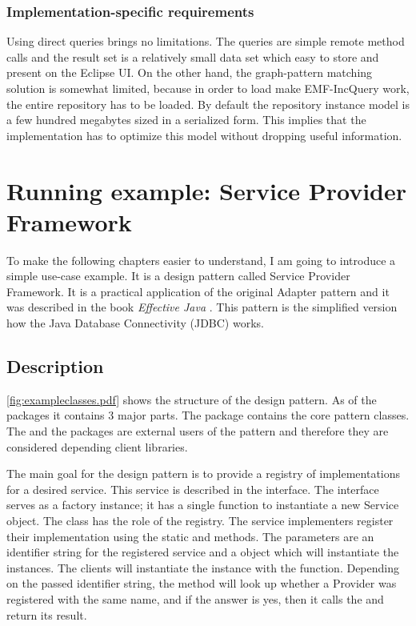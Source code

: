 \subsubsection{Implementation-specific requirements}
Using direct queries brings no limitations. The queries are simple remote method
calls and the result set is a relatively small data set which easy to store and
present on the Eclipse UI. On the other hand, the graph-pattern matching
solution is somewhat limited, because in order to load make EMF-IncQuery work,
the entire repository has to be loaded. By default the repository instance model
is a few hundred megabytes sized in a serialized form. This implies that the
implementation has to optimize this model without dropping useful information.

\section{Running example: Service Provider Framework}\label{sect:spf}

To make the following chapters easier to understand, I am going to introduce a
simple use-case example. It is a design pattern called Service Provider
Framework. It is a practical application of the original Adapter pattern and it
was described in the book \emph{Effective Java} \cite{Bloch08}. This pattern
is the simplified version how the Java Database Connectivity (JDBC) works.


\subsection{Description}\label{sect:spfdesc}



\autoref{fig:exampleclasses.pdf} shows the structure of the design pattern. As of
the packages it contains 3 major parts.
The  package contains the core pattern classes. The 
and the  packages are external users of the pattern and therefore
they are considered depending client libraries.

The main goal for the design pattern is to provide a registry of implementations
for a desired service. This service is described in the 
interface. The  interface serves as a factory instance; it has
a single function to instantiate a new Service object. The  class
has the role of the registry.
The service implementers register their implementation using the static
 and  methods. The
parameters are an identifier string for the registered service and a 
object which will instantiate the  instances. The clients will
instantiate the  instance with the  function.
Depending on the passed identifier string, the method will look up whether a Provider
was registered with the same name, and if the answer is yes, then it calls the
 and return its result.

